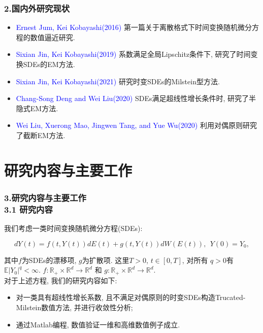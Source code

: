\documentclass[notheorems,10pt,compress]{beamer}
\newcommand{\RR}{\ensuremath{\mathbb{R}}}
\newcommand{\EE}{\mathbb{E}}
\numberwithin{figure}{section}
\numberwithin{table}{section}
\numberwithin{equation}{section}
\numberwithin{theorem}{section}
\numberwithin{definition}{section}
\numberwithin{lemma}{section}
\numberwithin{proposition}{section}
\numberwithin{corollary}{section}
\theoremstyle{example}
\newcommand{\blue}[1]{\textcolor{blue}{#1}}
\begin{document}
        
        \begin{frame}
            \frametitle{2.国内外研究现状\\}
            \begin{itemize}
                \setlength{\itemsep}{10pt}
         \item \blue{ Ernest Jum, Kei Kobayashi(2016) } 第一篇关于离散格式下时间变换随机微分方程的数值逼近研究. 
          \item \blue{ Sixian Jin, Kei Kobayashi(2019) }  系数满足全局Lipschitz条件下, 研究了时间变换SDEs的EM方法.
    \item \blue{ Sixian Jin, Kei Kobayashi(2021) } 研究时变SDEs的Milstein型方法.
    \item \blue{ Chang-Song Deng and Wei Liu(2020) } SDEs满足超线性增长条件时, 研究了半隐式EM方法.
     \item \blue{Wei Liu, Xuerong Mao, Jingwen Tang, and Yue Wu(2020) }利用对偶原则研究了截断EM方法. 
            \end{itemize}
        \end{frame}
\section{研究内容与主要工作}

\begin{frame}
    \frametitle{3.研究内容与主要工作\\ 3.1 研究内容}
   \setlength{\parindent}{2em}我们考虑一类时间变换随机微分方程(SDEs):
   \begin{block}{}
       \begin{equation*}\label{SDE}
           dY(t) = f(t,Y(t))dE(t) + g(t,Y(t))dW(E(t)),~~Y(0) = Y_0,
       \end{equation*}
   \end{block}
   其中$f$为SDEs的漂移项, $g$为扩散项. 这里$T>0$, $t\in [0,T]$, 对所有 $q > 0$有$\EE |Y_0|^q < \infty$. $f: \RR_+ \times \RR^d \rightarrow \RR^d$ 和 $g: \RR_+ \times \RR^d \rightarrow \RR^{d}$.
\\ 对于上述方程, 我们的\alert{研究内容}如下:
\begin{itemize}
    \setlength{\itemsep}{0.1pt}
    \item 对一类具有超线性增长系数, 且不满足对偶原则的时变SDEs构造Trucated-Milstein数值方法, 并进行收敛性分析;
    \item 通过Matlab编程, 数值验证一维和高维数值例子成立.
\end{itemize}
\end{frame}
\end{document}
